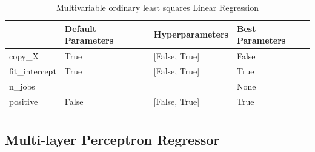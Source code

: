 \documentclass[referee,lineno,pdflatex,sn-nature]{sn-jnl}%
\theoremstyle{thmstyleone}%
\theoremstyle{thmstyletwo}%
\theoremstyle{thmstylethree}%
\begin{document}
\begin{appendices}
\begin{table}[h]
    \caption{Multivariable ordinary least squares Linear Regression}%
    \begin{tabular}{@{}llll@{}}
        \toprule
        & Default Parameters & Hyperparameters & Best Parameters \\
        \midrule
        copy\_X & True & {[}False, True{]} & False \\
        fit\_intercept & True & {[}False, True{]} & True \\
        n\_jobs & & & None \\
        positive & False & {[}False, True{]} & True \\
        \botrule
    \end{tabular}
\end{table}

\subsection{Multi-layer Perceptron Regressor}\label{secA4.7}


\end{appendices}
\end{document}
